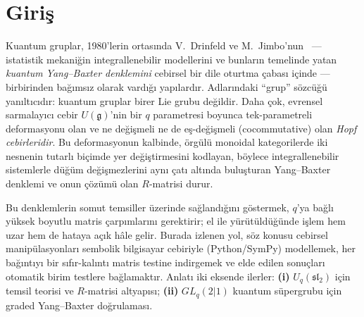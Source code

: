 \documentclass[12pt,a4paper,fleqn]{report}
\newcommand{\normalsemi}{;}
\newcommand{\normalsemi}{\begingroup\semicolonfont;\endgroup}
\numberwithin{equation}{chapter}
\theoremstyle{plain}
\theoremstyle{definition}
\renewcommand{\sl}{\mathfrak{sl}}
\newcommand{\gfrak}{\mathfrak{g}}
\newcommand{\Uq}{U_q(\sl_2)}
\begin{document}
\setcounter{page}{1}

\chapter{Giriş}

Kuantum gruplar, 1980'lerin ortasında V.~Drinfeld ve M.~Jimbo'nun~\cite{Drinfeld,Jimbo,KS} --- istatistik
mekaniğin integrallenebilir modellerini ve bunların temelinde yatan
\emph{kuantum Yang--Baxter denklemini} cebirsel bir dile oturtma çabası içinde ---
birbirinden bağımsız olarak vardığı yapılardır. Adlarındaki ``grup'' sözcüğü
yanıltıcıdır: kuantum gruplar birer Lie grubu değildir. Daha çok, evrensel
sarmalayıcı cebir $U(\gfrak)$'nin bir $q$ parametresi boyunca tek-parametreli
deformasyonu olan ve ne değişmeli ne de eş-değişmeli (cocommutative) olan
\emph{Hopf cebirleridir}. Bu deformasyonun kalbinde, örgülü monoidal
kategorilerde iki nesnenin tutarlı biçimde yer değiştirmesini kodlayan, böylece
integrallenebilir sistemlerle düğüm değişmezlerini aynı çatı altında buluşturan
Yang--Baxter denklemi ve onun çözümü olan $R$-matrisi durur.

Bu denklemlerin somut temsiller üzerinde sağlandığını göstermek, $q$'ya bağlı
yüksek boyutlu matris çarpımlarını gerektirir\normalsemi{} el ile yürütüldüğünde işlem hem
uzar hem de hataya açık hâle gelir. Burada izlenen yol, söz konusu cebirsel
manipülasyonları sembolik bilgisayar cebiriyle (Python/SymPy) modellemek, her
bağıntıyı bir sıfır-kalıntı matris testine indirgemek ve elde edilen sonuçları
otomatik birim testlere bağlamaktır. Anlatı iki eksende ilerler: \textbf{(i)}
$\Uq$ için temsil teorisi ve $R$-matrisi altyapısı\normalsemi{} \textbf{(ii)} $GL_q(2|1)$
kuantum süpergrubu için graded Yang--Baxter doğrulaması.
\end{document}
